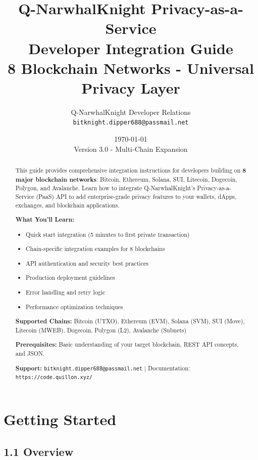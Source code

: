 \documentclass[11pt,a4paper]{article}
\title{\textbf{Q-NarwhalKnight Privacy-as-a-Service}\\
\large Developer Integration Guide\\
\vspace{0.5cm}
8 Blockchain Networks - Universal Privacy Layer}
\author{Q-NarwhalKnight Developer Relations\\
\texttt{bitknight.dipper688@passmail.net}}
\date{\today\\Version 3.0 - Multi-Chain Expansion}
\begin{document}
\maketitle

\begin{abstract}
\noindent
This guide provides comprehensive integration instructions for developers building on \textbf{8 major blockchain networks}: Bitcoin, Ethereum, Solana, SUI, Litecoin, Dogecoin, Polygon, and Avalanche. Learn how to integrate Q-NarwhalKnight's Privacy-as-a-Service (PaaS) API to add enterprise-grade privacy features to your wallets, dApps, exchanges, and blockchain applications.

\vspace{0.3cm}
\noindent
\textbf{What You'll Learn:}
\begin{itemize}
    \item Quick start integration (5 minutes to first private transaction)
    \item Chain-specific integration examples for 8 blockchains
    \item API authentication and security best practices
    \item Production deployment guidelines
    \item Error handling and retry logic
    \item Performance optimization techniques
\end{itemize}

\vspace{0.3cm}
\noindent
\textbf{Supported Chains:} Bitcoin (UTXO), Ethereum (EVM), Solana (SVM), SUI (Move), Litecoin (MWEB), Dogecoin, Polygon (L2), Avalanche (Subnets)

\vspace{0.3cm}
\noindent
\textbf{Prerequisites:} Basic understanding of your target blockchain, REST API concepts, and JSON.

\vspace{0.3cm}
\noindent
\textbf{Support:} \texttt{bitknight.dipper688@passmail.net} | Documentation: \texttt{https://code.quillon.xyz/}
\end{abstract}

\newpage
\tableofcontents
\newpage

\section{Getting Started}

\subsection{1.1 Overview}
\end{document}
